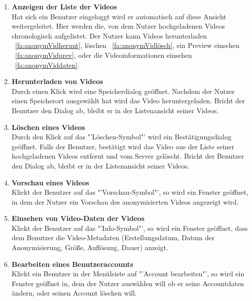 \begin{enumerate}
\item \label{fa:anonymVidAnzeigen}\textbf{Anzeigen der Liste der  Videos} \hfill \\
Hat sich ein Benutzer eingeloggt wird er automatisch auf diese Ansicht weitergeleitet. Hier werden die, von dem Nutzer hochgeladenen Videos chronologisch aufgelistet. Der Nutzer kann Videos herunterladen ~\eqref{fa:anonymVidherunt}, löschen ~\eqref{fa:anonymVidlösch}, ein Preview einsehen ~\eqref{fa:anonymVidprev}, oder die Videoinformationen einsehen ~\eqref{fa:anonymViddaten}.

\item \label{fa:anonymVidherunt}\textbf{Herunterladen von  Videos} \hfill \\
Durch einen Klick wird eine Speicherdialog geöffnet. Nachdem der Nutzer einen Speicherort ausgewählt hat wird das Video heruntergeladen. Bricht der Benutzer den Dialog ab, bleibt er in der Listenansicht seiner Videos.

\item \label{fa:anonymVidlösch}\textbf{Löschen eines  Videos} \hfill \\
Durch den Klick auf das "'Löschen-Symbol"' wird ein Bestätigungsdialog geöffnet. Falls der Benutzer, bestätigt wird das Video aus der Liste seiner hochgeladenen Videos entfernt und vom Server gelöscht. Bricht der Benutzer den Dialog ab, bleibt er in der Listenansicht seiner Videos.

\item \label{fa:anonymVidprev}\textbf{Vorschau eines  Videos} \hfill \\
Klickt der Benutzer auf das "'Vorschau-Symbol"', so wird ein Fenster geöffnet, in dem der Nutzer ein Vorschau des anonymisierten Videos angezeigt wird.

\item \label{fa:anonymViddaten}\textbf{Einsehen von Video-Daten der  Videos} \hfill \\
Klickt der Benutzer auf das "'Info-Symbol"', so wird ein Fenster geöffnet, dass dem Benutzer die Video-\gls{Metadaten} (Erstellungsdatum, Datum der Anonymisierung, Größe, Auflösung, Dauer) anzeigt.

\item \label{fa:accBearb}\textbf{Bearbeiten eines Benutzeraccounts} \hfill \\
Klickt ein Benutzer in der Menüleiste auf "'Account bearbeiten"', so wird ein Fenster geöffnet in, dem der Nutzer auswählen will ob er seine Accountdaten ändern, oder seinen Account löschen will.


\end{enumerate}
